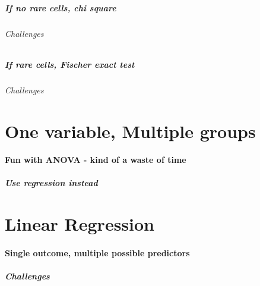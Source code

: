 \documentclass[
]{book}
\begin{document}
\hypertarget{if-no-rare-cells-chi-square}{%
\paragraph{If no rare cells, chi square}\label{if-no-rare-cells-chi-square}}

\hypertarget{challenges-5}{%
\subparagraph{Challenges}\label{challenges-5}}

\hypertarget{if-rare-cells-fischer-exact-test}{%
\paragraph{If rare cells, Fischer exact test}\label{if-rare-cells-fischer-exact-test}}

\hypertarget{challenges-6}{%
\subparagraph{Challenges}\label{challenges-6}}

\hypertarget{one-variable-multiple-groups}{%
\chapter{One variable, Multiple groups}\label{one-variable-multiple-groups}}

\hypertarget{fun-with-anova---kind-of-a-waste-of-time}{%
\subsubsection{Fun with ANOVA - kind of a waste of time}\label{fun-with-anova---kind-of-a-waste-of-time}}

\hypertarget{use-regression-instead}{%
\paragraph{Use regression instead}\label{use-regression-instead}}

\hypertarget{linear-regression}{%
\chapter{Linear Regression}\label{linear-regression}}

\hypertarget{single-outcome-multiple-possible-predictors}{%
\subsubsection{Single outcome, multiple possible predictors}\label{single-outcome-multiple-possible-predictors}}

\hypertarget{challenges-7}{%
\paragraph{Challenges}\label{challenges-7}}
\end{document}
